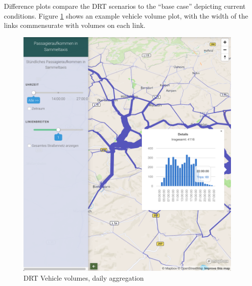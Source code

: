 Difference plots compare the DRT scenarios to the ``base case'' depicting current conditions. Figure \ref{fig:avov-vehicles-daily} shows an example vehicle volume plot, with the width of the links commensurate with volumes on each link.

\begin{figure}[ht]
  \centering
  \begin{minipage}[c]{0.45\textwidth}
     \includegraphics[width=\linewidth]{chapters/22-avov/images/fig-link-vols.png}
     \caption{DRT Vehicle volumes, daily aggregation }
     \label{fig:avov-vehicles-daily}
  \end{minipage}
  \begin{minipage}[c]{0.45\textwidth}

\end{minipage}
\end{figure}
